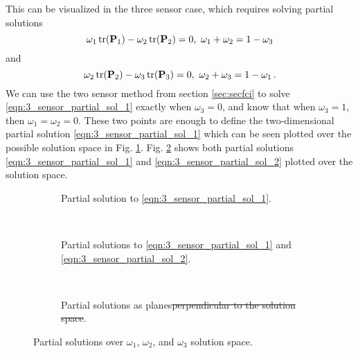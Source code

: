 \documentclass[letterpaper, 10 pt, conference]{ieeeconf}  %
\providecommand{\DIFdel}[1]{{\protect\color{red}\sout{#1}}}                      %
\providecommand{\DIFdelFL}[1]{\DIFdel{#1}} %
\providecommand{\DIFaddbeginFL}{} %
\providecommand{\DIFaddendFL}{} %
\providecommand{\DIFdelbeginFL}{} %
\providecommand{\DIFdelendFL}{} %
\begin{document}
This can be visualized in the three sensor case, which requires solving partial solutions
\begin{equation}
   \omega_1 \operatorname{tr}({{\mathbf{P}}}_1) - \omega_2 \operatorname{tr}({{\mathbf{P}}}_2) = 0,\ \omega_1+\omega_2=1-\omega_3 \label{eqn:3_sensor_partial_sol_1}
\end{equation}
and
\begin{equation}
   \omega_2 \tr(\mP_2) - \omega_3 \tr(\mP_3) = 0,\ \omega_2+\omega_3=1-\omega_1\,. \label{eqn:3_sensor_partial_sol_2}
\end{equation}
We can use the two sensor method from section \ref{sec:secfci} to solve \eqref{eqn:3_sensor_partial_sol_1} exactly when $\omega_3=0$, and know that when $\omega_3=1$, then $\omega_1=\omega_2=0$. These two points are enough to define the two-dimensional partial solution \eqref{eqn:3_sensor_partial_sol_1} which can be seen plotted over the possible solution space in Fig. \ref{fig:3_sensor_partial_sol}. Fig. \ref{fig:3_sensor_partial_sols} shows both partial solutions \eqref{eqn:3_sensor_partial_sol_1} and \eqref{eqn:3_sensor_partial_sol_2} plotted over the solution space.
\begin{figure*}[tb]
   \begin{subfigure}[t]{0.3\textwidth}
      \DIFaddbeginFL \vspace{-5pt}
      \DIFaddendFL \begin{center}
         
      \end{center}
      \DIFaddbeginFL \vspace{-10pt}
      \DIFaddendFL \caption{Partial solution to \eqref{eqn:3_sensor_partial_sol_1}.}
      \label{fig:3_sensor_partial_sol}
   \end{subfigure}
   ~
   \begin{subfigure}[t]{0.3\textwidth}
      \DIFaddbeginFL \vspace{-5pt}
      \DIFaddendFL \begin{center}
         
      \end{center}
      \DIFaddbeginFL \vspace{-10pt}
      \DIFaddendFL \caption{Partial solutions to \eqref{eqn:3_sensor_partial_sol_1} and \eqref{eqn:3_sensor_partial_sol_2}.}
      \label{fig:3_sensor_partial_sols}
   \end{subfigure}
   ~
   \begin{subfigure}[t]{0.3\textwidth}
      \DIFaddbeginFL \vspace{-5pt}
      \DIFaddendFL \begin{center}
         
      \end{center}
      \DIFaddbeginFL \vspace{-10pt}
      \DIFaddendFL \caption{Partial solutions as planes\DIFdelbeginFL \DIFdelFL{perpendicular to the solution space}\DIFdelendFL .}
      \label{fig:3sen_planes}
   \end{subfigure}
   \caption{Partial solutions over $\omega_1$, $\omega_2$, and $\omega_3$ solution space.}
   \vspace{-\baselineskip}
   \label{fig:partial_sols_and_planes}
\end{figure*}
\end{document}
